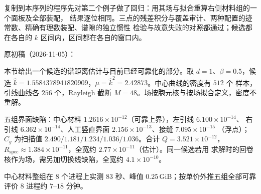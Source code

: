 复制到本序列的程序先对第二个例子做了回归：用其场与拟合重算右侧材料组的一个面板及全部装配，
结果逐位相同。三点的残差积分与覆盖审计、两种配置的迹常数、精确有理数装配、谱隙的独立惯性
检验与故意失败的对照都通过；候选都在各自的 $k$ 区间内，区间都在各自的窗口内。

\begin{workonly}
原初稿（2026-11-05）：

本节给出一个候选的谱距离估计与目前已经可靠化的部分。取 $d=1$、$\beta=0.5$，候选
$\widehat k=1.5584378941820909$，$\mu=\widehat k^2=2.42873$。中心曲线的密度有 $512$ 个
样本，引线曲线各 $256$ 个，Rayleigh 截断 $M=48$。场按胞元核与按场拟合定义，密度不重解。

五组界面缺陷：中心材料 $1.2616\times10^{-12}$（可靠上界），左引线 $6.100\times10^{-14}$、
右引线 $6.362\times10^{-14}$、人工竖直界面 $2.156\times10^{-13}$、接缝 $7.095\times10^{-15}$
（浮点）；$C_g$ 为扫描值 $2.490/1.181/1.234/1.036/1.036$。合计 $Q=3.521\times10^{-12}$，
$R_{\mathrm{spec}}\approx1.384\times10^{-11}$，全宽约 $2.77\times10^{-11}$（估计）。同一候选若用
求解时的回卷核作为场，需另加切换线缺陷，全宽约 $4.1\times10^{-10}$。

中心材料整组在 $8$ 个进程上实测 $83$ 秒、峰值 $0.25$\,GiB；按单价外推五组全部可靠评价
$8$ 进程约 $7$--$18$ 分钟。
\end{workonly}
